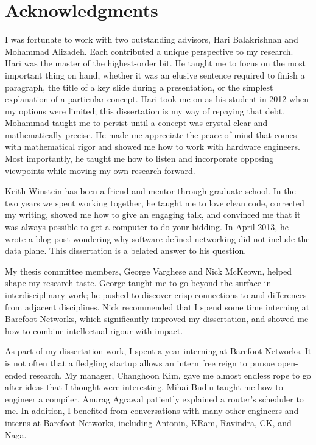 \chapter*{Acknowledgments}
%

I was fortunate to work with two outstanding advisors, Hari Balakrishnan and
Mohammad Alizadeh. Each contributed a unique perspective to my research.  Hari
was the master of the highest-order bit. He taught me to focus on the most
important thing on hand, whether it was an elusive sentence required to finish
a paragraph, the title of a key slide during a presentation, or the simplest
explanation of a particular concept. Hari took me on as his student in 2012
when my options were limited; this dissertation is my way of repaying that
debt. Mohammad taught me to persist until a concept was crystal clear and
mathematically precise. He made me appreciate the peace of mind that comes with
mathematical rigor and showed me how to work with hardware engineers.  Most
importantly, he taught me how to listen and incorporate opposing viewpoints
while moving my own research forward.

Keith Winstein has been a friend and mentor through graduate school.  In the
two years we spent working together, he taught me to love clean code, corrected
my writing, showed me how to give an engaging talk, and convinced me that it
was always possible to get a computer to do your bidding. In April 2013, he
wrote a blog post wondering why software-defined networking did not include the
data plane. This dissertation is a belated answer to his question.

My thesis committee members, George Varghese and Nick McKeown, helped shape my
research taste. George taught me to go beyond the surface in interdisciplinary
work; he pushed to discover crisp connections to and differences from adjacent
disciplines. Nick recommended that I spend some time interning at Barefoot
Networks, which significantly improved my dissertation, and showed me how to
combine intellectual rigour with impact.

As part of my dissertation work, I spent a year interning at Barefoot Networks.
It is not often that a fledgling startup allows an intern free reign to pursue
open-ended research. My manager, Changhoon Kim, gave me almost endless rope to
go after ideas that I thought were interesting. Mihai Budiu taught me how to
engineer a compiler. Anurag Agrawal patiently explained a router's scheduler to
me. In addition, I benefited from conversations with many other engineers and
interns at Barefoot Networks, including Antonin, KRam, Ravindra, CK, and Naga.

